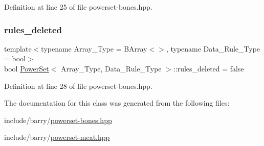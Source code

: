 Definition at line 25 of file powerset-\/bones.\+hpp.

\mbox{\label{class_power_set_a08b6baf1e244e023d997ddaecbc2116f}} 
\subsubsection{\texorpdfstring{rules\+\_\+deleted}{rules\_deleted}}
{\footnotesize\ttfamily template$<$typename Array\+\_\+\+Type  = B\+Array$<$$>$, typename Data\+\_\+\+Rule\+\_\+\+Type  = bool$>$ \\
bool \hyperlink{class_power_set}{Power\+Set}$<$ Array\+\_\+\+Type, Data\+\_\+\+Rule\+\_\+\+Type $>$\+::rules\+\_\+deleted = false}



Definition at line 28 of file powerset-\/bones.\+hpp.



The documentation for this class was generated from the following files\+:\begin{DoxyCompactItemize}
\item 
include/barry/\hyperlink{powerset-bones_8hpp}{powerset-\/bones.\+hpp}\item 
include/barry/\hyperlink{powerset-meat_8hpp}{powerset-\/meat.\+hpp}\end{DoxyCompactItemize}
